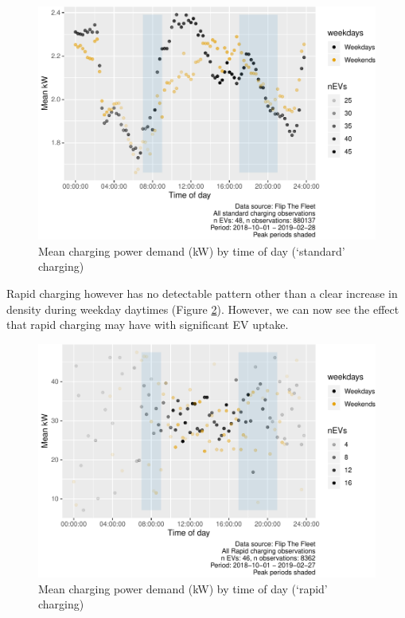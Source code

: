 \documentclass[]{article}
\begin{document}
\begin{figure}
\centering
\includegraphics{EVBB_report_v1_files/figure-latex/meanChargeByTimeStd-1.pdf}
\caption{\label{fig:meanChargeByTimeStd}Mean charging power demand (kW) by time of day (`standard' charging)}
\end{figure}

Rapid charging however has no detectable pattern other than a clear increase in density during weekday daytimes (Figure \ref{fig:meanChargeByTimeRapid}). However, we can now see the effect that rapid charging may have with significant EV uptake.

\begin{figure}
\centering
\includegraphics{EVBB_report_v1_files/figure-latex/meanChargeByTimeRapid-1.pdf}
\caption{\label{fig:meanChargeByTimeRapid}Mean charging power demand (kW) by time of day (`rapid' charging)}
\end{figure}
\end{document}
